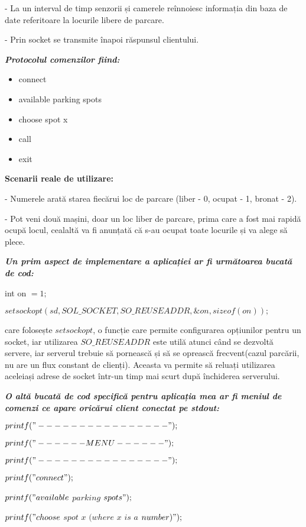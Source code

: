 \documentclass{article}
\begin{document}
- La un interval de timp senzorii și camerele reînnoiesc informația din baza de date referitoare la locurile libere de parcare.

- Prin socket se transmite înapoi răspunsul clientului.

\textbf{\textit{Protocolul comenzilor fiind:}}

\begin{itemize}
    \item connect
    \item available parking spots
    \item choose spot x
    \item call
    \item exit
\end{itemize}

\textbf{Scenarii reale de utilizare:}

- Numerele arată starea fiecărui loc de parcare (liber - 0, ocupat - 1, bronat - 2).

- Pot veni două mașini, doar un loc liber de parcare, prima care a fost mai rapidă ocupă locul, cealaltă va fi anunțată că s-au ocupat toate locurile și va alege să plece.

\textbf{\textit{Un prim aspect de implementare a aplicației ar fi următoarea bucată de cod:}}

int on $ = 1;$

$setsockopt(sd, SOL\_SOCKET, SO\_REUSEADDR, \&on, sizeof(on));$

care folosește $setsockopt$, o funcție care permite configurarea opțiunilor pentru un socket, iar utilizarea $SO\_REUSEADDR$ este utilă atunci când se dezvoltă servere, iar serverul trebuie să pornească și să se oprească frecvent(cazul parcării, nu are un flux constant de clienți). Aceasta va permite să reluați utilizarea aceleiași adrese de socket într-un timp mai scurt după închiderea serverului.

\textbf{\textit{O altă bucată de cod specifică pentru aplicația mea ar fi meniul de comenzi ce apare oricărui client conectat pe stdout:}}

$printf("----------------");$

$printf("------MENU------");$

$printf("----------------");$

$printf("connect");$

$printf("available$ $parking$ $spots");$

$printf("choose$ $spot$ $x$ $(where$ $x$ $is$ $a$ $number)");$
\end{document}
